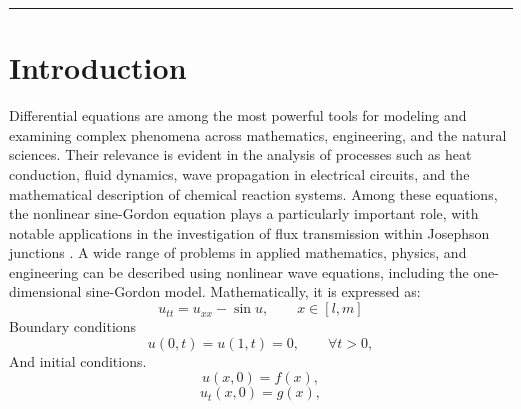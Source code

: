 \documentclass[10pt,letterpaper,twoside]{article}
\begin{document}
\vspace{4pt}

{\color{nspteal}\rule{\textwidth}{2pt}}\par
\vspace{6pt}

\section{Introduction}
Differential equations are among the most powerful tools for modeling and examining complex phenomena across mathematics, engineering, and the natural sciences. Their relevance is evident in the analysis of processes such as heat conduction, fluid dynamics, wave propagation in electrical circuits, and the mathematical description of chemical reaction systems. Among these equations, the nonlinear sine-Gordon equation plays a particularly important role, with notable applications in the investigation of flux transmission within Josephson junctions \cite{1}. A wide range of problems in applied mathematics, physics, and engineering can be described using nonlinear wave equations, including the one-dimensional sine-Gordon model. Mathematically, it is expressed as:
\begin{equation}\label{p1.1}
 u_{tt}=u_{xx}-\sin{u},\quad\quad x\in [l,m]
\end{equation}
Boundary conditions 
\begin{equation*}
u(0,t)=u(1,t)=0, \quad\quad \forall t>0,
\end{equation*}
And initial conditions. 
\begin{equation*}
 u(x,0)=f(x), 
\end{equation*}
\begin{equation*}
 u_t(x,0)=g(x),
\end{equation*}
\end{document}
